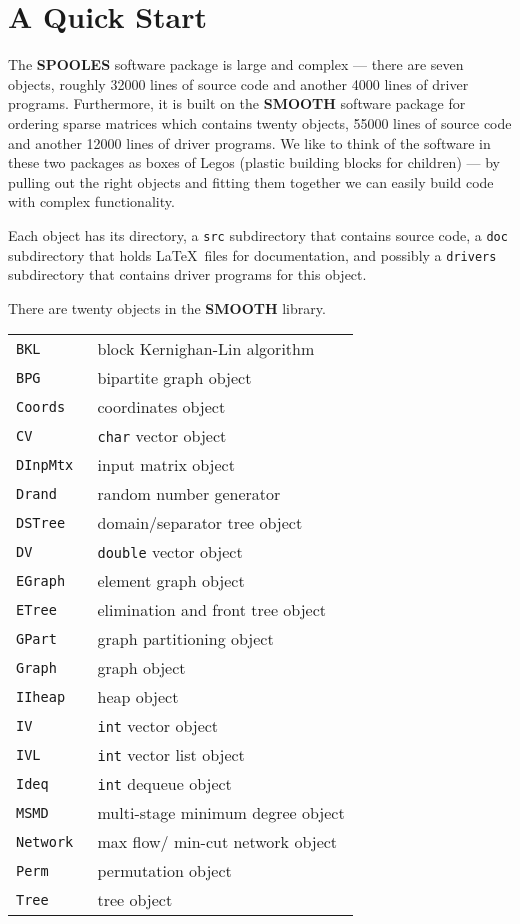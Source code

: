 \par
\chapter{A Quick Start}
\label{chapter:quickstart}
\par
The {\bf SPOOLES} software package is large and complex ---
there are seven objects, roughly 32000 lines of source code 
and another 4000 lines of driver programs.
Furthermore, it is built on the {\bf SMOOTH} software package 
for ordering sparse matrices which contains twenty objects,
55000 lines of source code and another 12000 lines
of driver programs.
We like to think of the software in these two packages
as boxes of Legos (plastic
building blocks for children) --- by pulling out the right objects
and fitting them together we can easily build code with complex
functionality.
\par
Each object has its directory, a {\tt src} subdirectory that
contains source code, a {\tt doc} subdirectory that holds \LaTeX\ 
files for documentation, and possibly a {\tt drivers} subdirectory
that contains driver programs for this object.
\par
There are twenty objects in the {\bf SMOOTH} library.
\begin{center}
\begin{tabular}{|l|l|} \hline
{\tt BKL } & block Kernighan-Lin algorithm \\
{\tt BPG } & bipartite graph object \\
{\tt Coords } & coordinates object \\
{\tt CV } & {\tt char} vector object \\
{\tt DInpMtx } & input matrix object \\
{\tt Drand } & random number generator \\
{\tt DSTree } & domain/separator tree object \\
{\tt DV } & {\tt double} vector object \\
{\tt EGraph } & element graph object \\
{\tt ETree } & elimination and front tree object \\
{\tt GPart } & graph partitioning object \\
{\tt Graph } & graph object \\
{\tt IIheap } & heap object \\
{\tt IV } & {\tt int} vector object \\
{\tt IVL } & {\tt int} vector list object \\
{\tt Ideq } & {\tt int} dequeue object \\
{\tt MSMD } & multi-stage minimum degree object \\
{\tt Network } & max flow/ min-cut network object \\
{\tt Perm } & permutation object \\
{\tt Tree } & tree object \\ \hline
\end{tabular}
\end{center}
